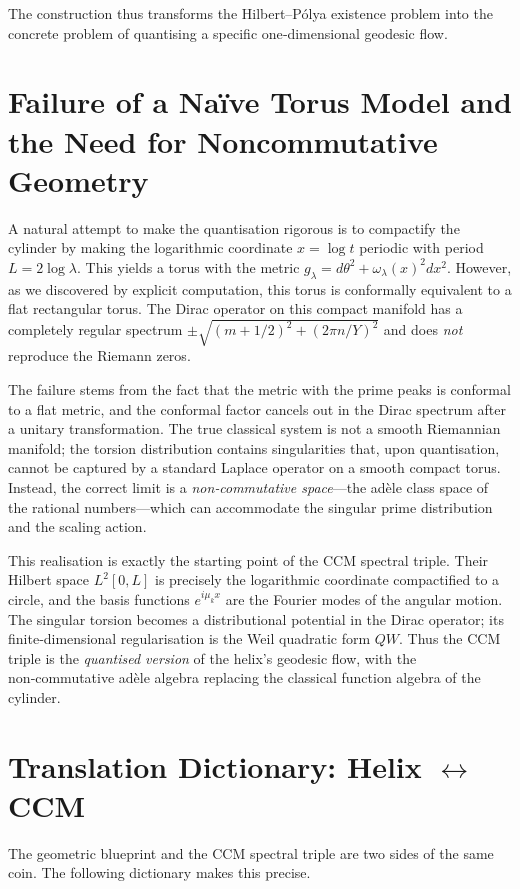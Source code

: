 \documentclass[12pt,a4paper]{article}
\begin{document}
The construction thus transforms the Hilbert–P\'olya existence problem into the concrete problem of quantising a specific one‑dimensional geodesic flow.

\section{Failure of a Na\"ive Torus Model and the Need for Noncommutative Geometry}
A natural attempt to make the quantisation rigorous is to compactify the cylinder by making the logarithmic coordinate \(x=\log t\) periodic with period \(L=2\log\lambda\). This yields a torus with the metric \(g_\lambda = d\theta^2 + \omega_\lambda(x)^2dx^2\). However, as we discovered by explicit computation, this torus is conformally equivalent to a flat rectangular torus. The Dirac operator on this compact manifold has a completely regular spectrum \(\pm\sqrt{(m+1/2)^2+(2\pi n/Y)^2}\) and does \emph{not} reproduce the Riemann zeros.

The failure stems from the fact that the metric with the prime peaks is conformal to a flat metric, and the conformal factor cancels out in the Dirac spectrum after a unitary transformation. The true classical system is not a smooth Riemannian manifold; the torsion distribution contains singularities that, upon quantisation, cannot be captured by a standard Laplace operator on a smooth compact torus. Instead, the correct limit is a \emph{non‑commutative space}—the adèle class space of the rational numbers—which can accommodate the singular prime distribution and the scaling action.

This realisation is exactly the starting point of the CCM spectral triple. Their Hilbert space \(L^2[0,L]\) is precisely the logarithmic coordinate compactified to a circle, and the basis functions \(e^{i\mu_k x}\) are the Fourier modes of the angular motion. The singular torsion becomes a distributional potential in the Dirac operator; its finite‑dimensional regularisation is the Weil quadratic form \(QW\). Thus the CCM triple is the \emph{quantised version} of the helix’s geodesic flow, with the non‑commutative adèle algebra replacing the classical function algebra of the cylinder.

\section{Translation Dictionary: Helix $\leftrightarrow$ CCM}
The geometric blueprint and the CCM spectral triple are two sides of the same coin. The following dictionary makes this precise.
\end{document}
